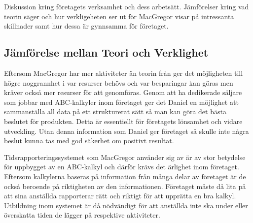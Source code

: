 Diskussion kring företagets verksamhet och dess arbetsätt. Jämförelser kring vad teorin säger och hur verkligeheten ser ut för MacGregor visar på intressanta skillnader samt hur dessa är gynnsamma för företaget.



\subsection{Jämförelse mellan Teori och Verklighet}
Eftersom MacGregor har mer aktiviteter än teorin från \cite{dne} ger det möjligheten till högre noggrannhet i var resurser behövs och var besparingar kan göras men kräver också mer resurser för att genomföras. Genom att ha dedikerade säljare som jobbar med ABC-kalkyler inom företaget ger det Daniel en möjlighet att sammanställa all data på ett strukturerat sätt så man kan göra det bästa beslutet för produkten. Detta är essentiellt för företagets lönsamhet och vidare utveckling. Utan denna information som Daniel ger företaget så skulle inte några beslut kunna tas med god säkerhet om positivt resultat.

Tidsrapporteringssystemet som MacGregor använder sig av är av stor betydelse för uppbygget av en ABC-kalkyl och därför krävs det ärlighet inom företaget. Eftersom kalkylerna baseras på information från många delar av företaget är de också beroende på riktigheten av den informationen. Företaget måste då lita på att sina anställda rapporterar rätt och riktigt för att upprätta en bra kalkyl. Utbildning inom systemet är då nödvändigt för att anställda inte ska under eller överskatta tiden de lägger på respektive aktiviteter.



